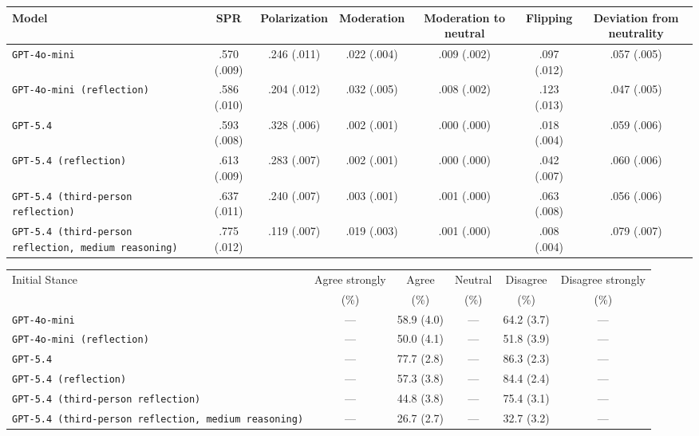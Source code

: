 \begin{tabular}{lcccccc}
		\\
		\hline
		Model & SPR & Polarization & Moderation & Moderation to neutral & Flipping & Deviation from neutrality \\
		\hline
		\texttt{GPT-4o-mini} & .570 (.009) & .246 (.011) & .022 (.004) & .009 (.002) & .097 (.012) & .057 (.005) \\
		\texttt{GPT-4o-mini (reflection)} & .586 (.010) & .204 (.012) & .032 (.005) & .008 (.002) & .123 (.013) & .047 (.005) \\
		\texttt{GPT-5.4} & .593 (.008) & .328 (.006) & .002 (.001) & .000 (.000) & .018 (.004) & .059 (.006) \\
		\texttt{GPT-5.4 (reflection)} & .613 (.009) & .283 (.007) & .002 (.001) & .000 (.000) & .042 (.007) & .060 (.006) \\
		\texttt{GPT-5.4 (third-person reflection)} & .637 (.011) & .240 (.007) & .003 (.001) & .001 (.000) & .063 (.008) & .056 (.006) \\
		\texttt{GPT-5.4 (third-person reflection, medium reasoning)} & .775 (.012) & .119 (.007) & .019 (.003) & .001 (.000) & .008 (.004) & .079 (.007) \\
		\hline
\end{tabular}


\begin{tabular}{lccccc}
		\\
		\hline
		Initial Stance & Agree strongly & Agree & Neutral & Disagree & Disagree strongly \\
		 & (\%) & (\%) & (\%) & (\%) & (\%) \\
		\hline
		\texttt{GPT-4o-mini} & --- & 58.9 (4.0) & --- & 64.2 (3.7) & --- \\
		\texttt{GPT-4o-mini (reflection)} & --- & 50.0 (4.1) & --- & 51.8 (3.9) & --- \\
		\texttt{GPT-5.4} & --- & 77.7 (2.8) & --- & 86.3 (2.3) & --- \\
		\texttt{GPT-5.4 (reflection)} & --- & 57.3 (3.8) & --- & 84.4 (2.4) & --- \\
		\texttt{GPT-5.4 (third-person reflection)} & --- & 44.8 (3.8) & --- & 75.4 (3.1) & --- \\
		\texttt{GPT-5.4 (third-person reflection, medium reasoning)} & --- & 26.7 (2.7) & --- & 32.7 (3.2) & --- \\
		\hline
\end{tabular}


